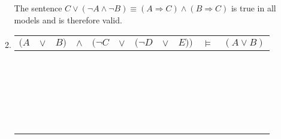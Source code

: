 \begin{enumerate}
\begin{enumerate}
The sentence $C \lor (\neg A \land \neg B) \equiv (A \Rightarrow C) \land (B \Rightarrow C)$ is true in all models and is therefore valid.

\item
\begin{tabular}{ccccccccc|c|c}
$(A$ & $\lor$ & $B)$ & $\land$ & $\big(\neg C$ & $\lor$ & $(\neg D$ & $\lor$ & $E)\big)$ & $\vDash$ & $(A \lor B)$\\
\hline
\F & \F & \F & \F & \T & \T & \T & \T & \F & \T & \F \\
\F & \F & \F & \F & \T & \T & \T & \T & \T & \T & \F \\
\F & \F & \F & \F & \T & \T & \F & \F & \F & \T & \F \\
\F & \F & \F & \F & \T & \T & \F & \T & \T & \T & \F \\
\F & \F & \F & \F & \F & \T & \T & \T & \F & \T & \F \\
\F & \F & \F & \F & \F & \T & \T & \T & \T & \T & \F \\
\F & \F & \F & \F & \F & \F & \F & \F & \F & \T & \F \\
\F & \F & \F & \F & \F & \T & \F & \T & \T & \T & \F \\
\F & \T & \T & \T & \T & \T & \T & \T & \F & \T & \T \\
\F & \T & \T & \T & \T & \T & \T & \T & \T & \T & \T \\
\F & \T & \T & \T & \T & \T & \F & \F & \F & \T & \T \\
\F & \T & \T & \T & \T & \T & \F & \T & \T & \T & \T \\
\F & \T & \T & \T & \F & \T & \T & \T & \F & \T & \T \\
\F & \T & \T & \T & \F & \T & \T & \T & \T & \T & \T \\
\F & \T & \T & \F & \F & \F & \F & \F & \F & \T & \T \\
\F & \T & \T & \T & \F & \T & \F & \T & \T & \T & \T \\
\T & \T & \F & \T & \T & \T & \T & \T & \F & \T & \T \\
\T & \T & \F & \T & \T & \T & \T & \T & \T & \T & \T \\
\T & \T & \F & \T & \T & \T & \F & \F & \F & \T & \T \\
\T & \T & \F & \T & \T & \T & \F & \T & \T & \T & \T \\
\T & \T & \F & \T & \F & \T & \T & \T & \F & \T & \T \\
\T & \T & \F & \T & \F & \T & \T & \T & \T & \T & \T \\
\T & \T & \F & \F & \F & \F & \F & \F & \F & \T & \T \\

\end{tabular}
\end{enumerate}
\end{enumerate}
